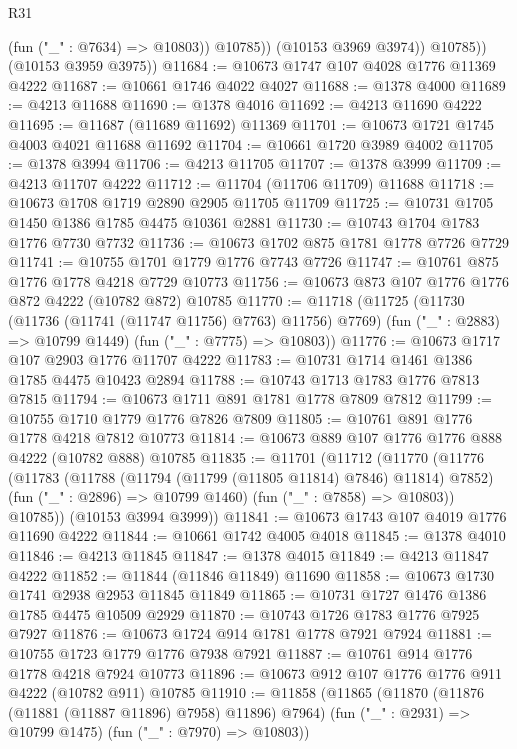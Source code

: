 \begin{lexlean}{R31}
\begin{coremodule}
                  (fun ("_" : @7634) => @10803))
                @10785))
            (@10153 @3969 @3974))
          @10785))
      (@10153 @3959 @3975))
@11684 := @10673 @1747 @107 @4028 @1776 @11369 @4222
@11687 := @10661 @1746 @4022 @4027
@11688 := @1378 @4000
@11689 := @4213 @11688
@11690 := @1378 @4016
@11692 := @4213 @11690 @4222
@11695 := @11687 (@11689 @11692) @11369
@11701 := @10673 @1721 @1745 @4003 @4021 @11688 @11692
@11704 := @10661 @1720 @3989 @4002
@11705 := @1378 @3994
@11706 := @4213 @11705
@11707 := @1378 @3999
@11709 := @4213 @11707 @4222
@11712 := @11704 (@11706 @11709) @11688
@11718 := @10673 @1708 @1719 @2890 @2905 @11705 @11709
@11725 := @10731 @1705 @1450 @1386 @1785 @4475 @10361 @2881
@11730 := @10743 @1704 @1783 @1776 @7730 @7732
@11736 := @10673 @1702 @875 @1781 @1778 @7726 @7729
@11741 := @10755 @1701 @1779 @1776 @7743 @7726
@11747 := @10761 @875 @1776 @1778 @4218 @7729 @10773
@11756 := @10673 @873 @107 @1776 @1776 @872 @4222 (@10782 @872) @10785
@11770 := @11718
    (@11725
      (@11730 (@11736 (@11741 (@11747 @11756) @7763) @11756) @7769)
      (fun ("_" : @2883) => @10799 @1449)
      (fun ("_" : @7775) => @10803))
@11776 := @10673 @1717 @107 @2903 @1776 @11707 @4222
@11783 := @10731 @1714 @1461 @1386 @1785 @4475 @10423 @2894
@11788 := @10743 @1713 @1783 @1776 @7813 @7815
@11794 := @10673 @1711 @891 @1781 @1778 @7809 @7812
@11799 := @10755 @1710 @1779 @1776 @7826 @7809
@11805 := @10761 @891 @1776 @1778 @4218 @7812 @10773
@11814 := @10673 @889 @107 @1776 @1776 @888 @4222 (@10782 @888) @10785
@11835 := @11701
    (@11712
      (@11770
        (@11776
          (@11783
            (@11788 (@11794 (@11799 (@11805 @11814) @7846) @11814) @7852)
            (fun ("_" : @2896) => @10799 @1460)
            (fun ("_" : @7858) => @10803))
          @10785))
      (@10153 @3994 @3999))
@11841 := @10673 @1743 @107 @4019 @1776 @11690 @4222
@11844 := @10661 @1742 @4005 @4018
@11845 := @1378 @4010
@11846 := @4213 @11845
@11847 := @1378 @4015
@11849 := @4213 @11847 @4222
@11852 := @11844 (@11846 @11849) @11690
@11858 := @10673 @1730 @1741 @2938 @2953 @11845 @11849
@11865 := @10731 @1727 @1476 @1386 @1785 @4475 @10509 @2929
@11870 := @10743 @1726 @1783 @1776 @7925 @7927
@11876 := @10673 @1724 @914 @1781 @1778 @7921 @7924
@11881 := @10755 @1723 @1779 @1776 @7938 @7921
@11887 := @10761 @914 @1776 @1778 @4218 @7924 @10773
@11896 := @10673 @912 @107 @1776 @1776 @911 @4222 (@10782 @911) @10785
@11910 := @11858
    (@11865
      (@11870 (@11876 (@11881 (@11887 @11896) @7958) @11896) @7964)
      (fun ("_" : @2931) => @10799 @1475)
      (fun ("_" : @7970) => @10803))

\end{coremodule}
\end{lexlean}
